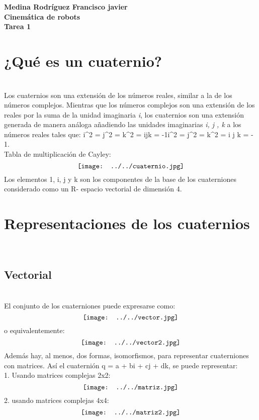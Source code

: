 \documentclass[12pt,a4paper]{report}
\author{Javier Medina}
\begin{document}
\textbf{Medina Rodríguez Francisco javier \\
Cinemática de robots\\
Tarea 1\\}
\section*{¿Qué es un cuaternio?}\\
Los cuaternios son una extensión de los números reales, similar a la de los números complejos. Mientras que los números complejos son una extensión de los reales por la suma de la unidad imaginaria \textit{i}, los cuaternios son una extensión generada de manera análoga añadiendo las unidades imaginarias \textit{i, j , k} a los números reales tales que: i^2 = j^2 = k^2 = ijk = -1i^2 = j^2 = k^2 = i j k = - 1.\\


Tabla de multiplicación de Cayley:\\
$$\texttt{[image: ../../cuaternio.jpg]} \\$$
Los elementos 1, i, j y k son los componentes de la base de los cuaterniones considerado como un R- espacio vectorial de dimensión 4.
\section{Representaciones de los cuaternios}\\
\subsection{Vectorial}\\
El conjunto de los cuaterniones puede expresarse como:\\
$$\texttt{[image: ../../vector.jpg]}\\$$
o equivalentemente: \\
$$\texttt{[image: ../../vector2.jpg]}\\$$
Además hay, al menos, dos formas, isomorfismos, para representar cuaterniones con matrices. Así el cuaternión q = a + bi + cj + dk, se puede representar:\\
1. Usando matrices complejas 2x2: \\
$$\texttt{[image: ../../matriz.jpg]}\\$$
2. usando matrices complejas 4x4:\\
$$\texttt{[image: ../../matriz2.jpg]}\\$$
\end{document}
